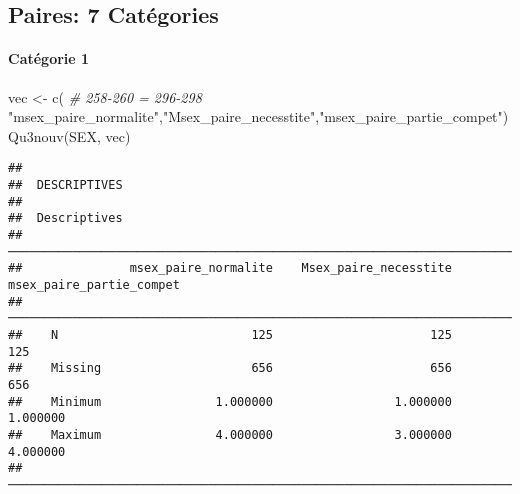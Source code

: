 \documentclass[
]{article}
\newenvironment{Shaded}{\begin{snugshade}}{\end{snugshade}}
\newcommand{\CommentTok}[1]{\textcolor[rgb]{0.56,0.35,0.01}{\textit{#1}}}
\newcommand{\DecValTok}[1]{\textcolor[rgb]{0.00,0.00,0.81}{#1}}
\newcommand{\FunctionTok}[1]{\textcolor[rgb]{0.00,0.00,0.00}{#1}}
\newcommand{\NormalTok}[1]{#1}
\newcommand{\OtherTok}[1]{\textcolor[rgb]{0.56,0.35,0.01}{#1}}
\newcommand{\SpecialCharTok}[1]{\textcolor[rgb]{0.00,0.00,0.00}{#1}}
\newcommand{\StringTok}[1]{\textcolor[rgb]{0.31,0.60,0.02}{#1}}
\begin{document}
\begin{Shaded}
\end{Shaded}

\hypertarget{paires-7-catuxe9gories}{%
\subsection{Paires: 7 Catégories}\label{paires-7-catuxe9gories}}

\hypertarget{catuxe9gorie-1-3}{%
\paragraph{Catégorie 1}\label{catuxe9gorie-1-3}}

\begin{Shaded}
\begin{Highlighting}[]
\NormalTok{vec }\OtherTok{\textless{}{-}} \FunctionTok{c}\NormalTok{(  }\CommentTok{\# 258{-}260 = 296{-}298}
  \StringTok{"msex\_paire\_normalite"}\NormalTok{,}\StringTok{"Msex\_paire\_necesstite"}\NormalTok{,}\StringTok{"msex\_paire\_partie\_compet"}\NormalTok{)}
\FunctionTok{Qu3nouv}\NormalTok{(SEX, vec)}
\end{Highlighting}
\end{Shaded}

\begin{verbatim}
## 
##  DESCRIPTIVES
## 
##  Descriptives                                                                             
##  ──────────────────────────────────────────────────────────────────────────────────────── 
##               msex_paire_normalite    Msex_paire_necesstite    msex_paire_partie_compet   
##  ──────────────────────────────────────────────────────────────────────────────────────── 
##    N                           125                      125                         125   
##    Missing                     656                      656                         656   
##    Minimum                1.000000                 1.000000                    1.000000   
##    Maximum                4.000000                 3.000000                    4.000000   
##  ────────────────────────────────────────────────────────────────────────────────────────
\end{verbatim}
\end{document}
